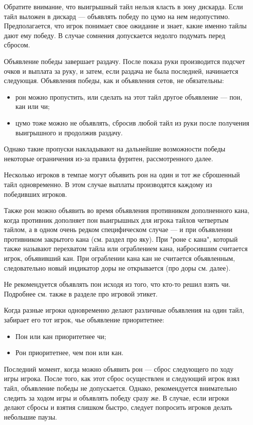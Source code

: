 Обратите внимание, что выигрышный тайл нельзя класть в зону дискарда. Если тайл выложен в дискард --- объявлять победу по цумо на нем недопустимо. Предполагается, что игрок понимает свое ожидание и знает, какие именно тайлы дают ему победу. В случае сомнения допускается недолго подумать перед сбросом.

Объявление победы завершает раздачу. После показа руки производится подсчет очков и выплата за руку, и затем, если раздача не была последней, начинается следующая. Объявления победы, как и объявления сетов, не обязательны:
\begin{itemize}
	\item рон можно пропустить, или сделать на этот тайл другое объявление --- пон, кан или чи;
	\item цумо тоже можно не объявлять, сбросив любой тайл из руки после получения выигрышного и продолжив раздачу.
\end{itemize}
Однако такие пропуски накладывают на дальнейшие возможности победы некоторые ограничения из-за правила фуритен, рассмотренного далее.

Несколько игроков в темпае могут объявить рон на один и тот же сброшенный тайл одновременно. В этом случае выплаты производятся каждому из победивших игроков. 

Также рон можно объявить во время объявления противником дополненного кана, когда противник дополняет пон выигрышных для игрока тайлов четвертым тайлом, а в одном очень редком специфическом случае --- и при объявлении противником закрытого кана (см. раздел про яку). При "роне с кана", который также называют перехватом тайла или ограблением кана, набросившим считается игрок, объявивший кан. При ограблении кана кан не считается объявленным, следовательно новый индикатор доры не открывается (про доры см. далее).

Не рекомендуется объявлять пон исходя из того, что кто-то решил взять чи. Подробнее см. также в разделе про игровой этикет.

Когда разные игроки одновременно делают различные объявления на один тайл, забирает его тот игрок, чье объявление приоритетнее:

\begin{itemize}
	\item Пон или кан приоритетнее чи;
	\item Рон приоритетнее, чем пон или кан.
\end{itemize}

Последний момент, когда можно объявить рон --- сброс следующего по ходу игры игрока. После того, как этот сброс осуществлен и следующий игрок взял тайл, объявление победы не допускается. Однако, рекомендуется внимательно следить за ходом игры и объявлять победу сразу же. В случае, если игроки делают сбросы и взятия слишком быстро, следует попросить игроков делать небольшие паузы.

